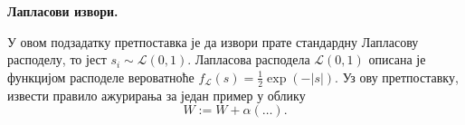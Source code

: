 \item {} \textbf{Лапласови извори.}

У овом подзадатку претпоставка је да извори прате стандардну Лапласову расподелу, то јест $s_i \sim \mathcal{L}(0,1)$. Лапласова расподела $\mathcal{L}(0,1)$ описана је функцијом расподеле вероватноће $f_{\mathcal{L}}(s) = \frac{1}{2}\exp\left(-|s| \right)$. Уз ову претпоставку, извести правило ажурирања за један пример у облику 
$$ W := W + \alpha \left(\ldots\right).$$

